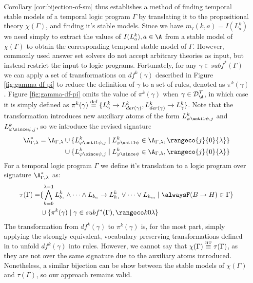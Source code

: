 Corollary \ref{cor:bijection-of-sm} thus establishes a method of
finding temporal stable models of a temporal logic program $\Gamma$ by
translating it to the propositional theory $\chi(\Gamma)$, and finding
it's stable models. Since we have $m_I(k,a)=I(L_a^k)$ we need simply
to extract the values of $I(L_a^k), a\in \A$ from a stable model of
$\chi(\Gamma)$ to obtain the corresponding temporal stable model of
$\Gamma$. However, commonly used answer set solvers do not accept
arbitrary theories as input, but instead restrict the input to logic
programs. Fortunately, for any $\gamma \in subf^*(\Gamma)$ we can
apply a set of transformations on $df^k(\gamma)$ described in Figure
\ref{fig:gamma-df-pi} to reduce the definition of $\gamma$ to a set of
rules, denoted as $\pi^k(\gamma)$. Figure \ref{fig:gamma-df-pi} omits
the value of $\pi^k(\gamma)$ when $\gamma \in \langdat$,
in which case it is simply defined as
$\pi^k(\gamma) \stackrel{\text{def}}{=} \{ L^k_{\gamma} \rightarrow L^k_{der(\gamma)},
L^k_{der(\gamma)} \rightarrow L^k_{\gamma} \}$. Note that the
transformation introduces new auxiliary atoms of the form
$L^k_{\varphi \until \psi,j}$ and $L^k_{\varphi \since \psi,j}$, so we
introduce the revised signature
\begin{align*}
\A_{\Gamma,\lambda}^* = \A_{\Gamma,\lambda} 
&\cup \{ L^k_{\varphi \until \psi,j} \mid L^k_{\varphi \until \psi} \in \A_{\Gamma,\lambda}, \rangeco{j}{0}{\lambda} \}\\
&\cup \{ L^k_{\varphi \since \psi,j} \mid L^k_{\varphi \since \psi} \in \A_{\Gamma,\lambda}, \rangeco{j}{0}{\lambda} \}
\end{align*}
For a temporal logic program $\Gamma$ we define it's translation to a logic
program over signature $\A_{\Gamma,\lambda}^*$ as:
\begin{align*}
  \tau(\Gamma)  = &\{ \bigwedge_{k=0}^{\lambda-1} L_{b_1}^k \land \dots \land L_{b_n}
                    \rightarrow L_{h_1}^k \lor \dots \lor L_{h_m} \mid \tempruleshort \in \Gamma \} \\
                  & \cup \{ \pi^k(\gamma) \mid \gamma \in subf^*(\Gamma), \kinlambda \}
\end{align*}
The transformation from $df^k(\gamma)$ to $\pi^k(\gamma)$ is, for the
most part, simply applying the strongly equivalent, vocabulary
preserving transformations defined in \cite{capeva05a} to unfold
$df^k(\gamma)$ into rules. However, we cannot say that
$\chi(\Gamma) \stackrel{\normalfont\mbox{\tiny HT}}{\equiv} \tau(\Gamma)$, as they are not over the same
signature due to the auxiliary atoms introduced. Nonetheless, a
similar bijection can be show between the stable models of
$\chi(\Gamma)$ and $\tau(\Gamma)$, so our approach remains valid.

